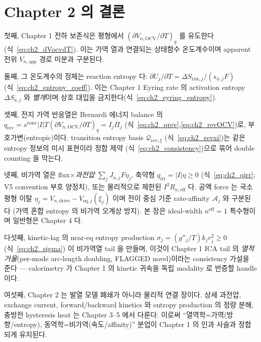 \documentclass[11pt,a4paper]{article}
\newcommand{\eff}{\mathrm{eff}}
\newcommand{\eq}{\mathrm{eq}}
\newcommand{\app}{\mathrm{app}}
\newcommand{\drive}{\mathrm{drive}}
\newcommand{\OCV}{\mathrm{OCV}}
\newcommand{\irr}{\mathrm{irr}}
\newcommand{\rev}{\mathrm{rev}}
\newcommand{\rxn}{\mathrm{rxn}}
\newcommand{\conv}{\mathrm{conv}}
\begin{document}
\section{Chapter 2 의 결론}\label{sec:ch2_concl}
첫째, Chapter 1 전하 보존식은 평형에서 $(\partial V_{n,\OCV}/\partial T)_q$ 를 유도한다(식~\eqref{eq:ch2_dVocvdT}).
이는 가역 열과 연결되는 상태함수 온도계수이며 apparent 전위 $V_{n,\app}$ 경로 미분과 구분된다.

둘째, 그 온도계수의 정체는 reaction entropy 다: $\partial U_j/\partial T=\Delta S_{\rxn,j}/(s_{\phi,j}F)$
(식~\eqref{eq:ch2_entropy_coeff}). 이는 Chapter 1 Eyring rate 의 activation entropy $\Delta S_{a,j}$ 와
\emph{별개}이며 상호 대입을 금지한다(식~\eqref{eq:ch2_eyring_entropy}).

셋째, 전지 가역 반응열은 Bernardi 에너지 balance 의 $q_\rev=s^{\conv}|I|T(\partial V_{n,\OCV}/\partial T)_q
=I_j\Pi_j$ (식~\eqref{eq:ch2_qrev},\eqref{eq:ch2_revOCV})로, 부호가변(entropic)이다. transition entropy basis
$\dot{\mathcal Q}_{\rev,\xi}$ (식~\eqref{eq:ch2_revxi})는 같은 entropy 정보의 미시 표현이라 정합 제약
(식~\eqref{eq:ch2_consistency})으로 묶어 double counting 을 막는다.

넷째, 비가역 열은 flux$\times$\emph{과전압} $\sum_jJ_{n,j}F\eta_j$, 축약형 $q_\irr=|I|\eta\ge0$
(식~\eqref{eq:ch2_qirr}; V5 convention 부호 양정치), 또는 물리적으로 제한된 $I^2R_{n,\eff}$ 다. 공액 force 는 국소
평형 이탈 $\eta_j=V_{n,\drive}-V_{\eq,j}(\xi_j)$ 이며 전이 중심 기준 rate-affinity $\mathcal A_j$ 와 구분된다
(가역 혼합 entropy 의 비가역 오계상 방지). 본 장은 ideal-width $n^\eff=1$ 특수형이며 일반형은 Chapter 4 다.

다섯째, kinetic-lag 의 near-eq entropy production $\sigma_j=(g''_j/T)k_j r_j^2\ge0$ (식~\eqref{eq:ch2_sigma})
이 비가역열 tail 을 만들며, 이것이 Chapter 1 ICA tail 의 \emph{열적 거울}(per-mode arc-length doubling, FLAGGED
novel)이라는 consistency 가설을 준다 — calorimetry 가 Chapter 1 의 kinetic 귀속을 독립 modality 로 반증할
handle 이다.

여섯째, Chapter 2 는 발열 모델 폐쇄가 아니라 물리적 연결 장이다. 상세 과전압, exchange current,
forward/backward kinetics 와 entropy production 의 정량 분해, 충방전 hysteresis heat 는 Chapter 3--5 에서
다룬다. 이로써 ``열역학=가역(방향/entropy), 동역학=비가역(속도/affinity)'' 분업이 Chapter 1 의 인과 사슬과
정합되게 유지된다.
\end{document}
